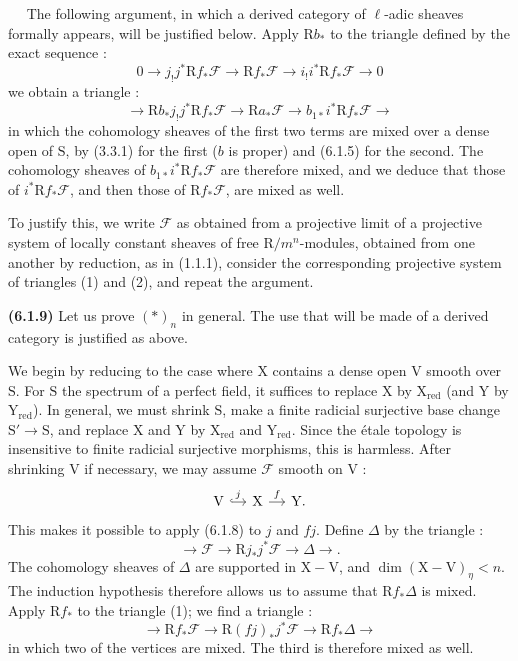 \documentclass[11pt,leqno]{article}
\newcommand{\Page}[1]{\ifvmode\noindent\else\unskip\ \fi{\footnotesize\textcolor{gray}{[p.\,#1]}}\ \ignorespaces}
\begin{document}
\Page{245}
The following argument, in which a derived category
of \(\ell\)-adic sheaves formally appears, will be justified below.
Apply \(\mathrm{R}b_*\) to the triangle defined by the exact sequence :
\[
\tag*{(1)}
0\to j_!j^*\mathrm{R}f_*\mathscr{F}
\to\mathrm{R}f_*\mathscr{F}
\to i_!i^*\mathrm{R}f_*\mathscr{F}\to0
\]
we obtain a triangle :
\[
\tag*{(2)}
\to\mathrm{R}b_*j_!j^*\mathrm{R}f_*\mathscr{F}
\to\mathrm{R}a_*\mathscr{F}
\to b_{1*}i^*\mathrm{R}f_*\mathscr{F}\to
\]
in which the cohomology sheaves of the first two terms
are mixed over a dense open of \(\mathrm{S}\), by (3.3.1)
for the first (\(b\) is proper) and (6.1.5) for the second.
The cohomology sheaves of \(b_{1*}i^*\mathrm{R}f_*\mathscr{F}\)
are therefore mixed, and we deduce that those of
\(i^*\mathrm{R}f_*\mathscr{F}\), and then those of
\(\mathrm{R}f_*\mathscr{F}\), are mixed as well.

To justify this, we write \(\mathscr{F}\) as obtained from a
projective limit of a projective system of locally constant sheaves
of free \(\mathrm{R}/m^n\)-modules, obtained from one another
by reduction, as in (1.1.1), consider the
corresponding projective system of triangles (1) and (2), and
repeat the argument.

\textbf{(6.1.9)} Let us prove \((*)_n\) in general. The use that will be made
of a derived category is justified as above.

We begin by reducing to the case where \(\mathrm{X}\) contains
a dense open \(\mathrm{V}\) smooth over \(\mathrm{S}\). For
\(\mathrm{S}\) the spectrum of a perfect field, it suffices to replace
\(\mathrm{X}\) by \(\mathrm{X}_{\mathrm{red}}\) (and \(\mathrm{Y}\)
by \(\mathrm{Y}_{\mathrm{red}}\)). In general, we must shrink
\(\mathrm{S}\), make a finite radicial surjective base change
\(\mathrm{S}'\to\mathrm{S}\), and replace \(\mathrm{X}\)
and \(\mathrm{Y}\) by \(\mathrm{X}_{\mathrm{red}}\) and
\(\mathrm{Y}_{\mathrm{red}}\). Since the étale topology is insensitive
to finite radicial surjective morphisms, this is harmless.
After shrinking \(\mathrm{V}\) if necessary, we may assume \(\mathscr{F}\)
smooth on \(\mathrm{V}\) :
\[
\begin{tikzcd}[column sep=small]
\mathrm{V} \arrow[r,hook,"j"] &
\mathrm{X} \arrow[r,"f"] &
\mathrm{Y}.
\end{tikzcd}
\]
This makes it possible to apply (6.1.8) to \(j\) and \(fj\). Define
\(\Delta\) by the triangle :
\[
\tag*{(1)}
\to\mathscr{F}\to\mathrm{R}j_*j^*\mathscr{F}\to\Delta\to.
\]
The cohomology sheaves of \(\Delta\) are supported in
\(\mathrm{X}-\mathrm{V}\), and
\(\dim(\mathrm{X}-\mathrm{V})_\eta<n\). The induction hypothesis
therefore allows us to assume that \(\mathrm{R}f_*\Delta\) is mixed.
Apply \(\mathrm{R}f_*\) to the triangle (1); we find a triangle :
\[
\to\mathrm{R}f_*\mathscr{F}
\to\mathrm{R}(fj)_*j^*\mathscr{F}
\to\mathrm{R}f_*\Delta\to
\]
in which two of the vertices are mixed. The third is therefore
mixed as well.
\end{document}

